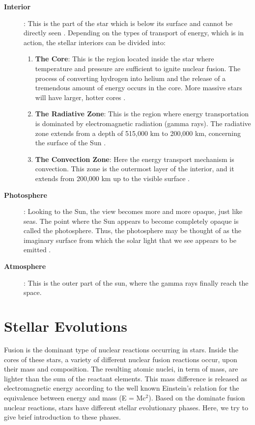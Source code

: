 \begin{description}
\item[\textbf{Interior}]: This is the part of the star which is below its surface and cannot be directly seen \citep{2019RSPTA.37790152A}. Depending on the types of transport of energy, which is in action, the stellar interiors can be divided into:
\begin{enumerate}
\item \textbf{The Core}: This is the region located inside the star where temperature and pressure are sufficient to ignite nuclear fusion. The process of converting hydrogen into helium and the release of a tremendous amount of energy occurs in the core. More massive stars will have larger, hotter cores \citep[e.g.,][]{1970AcA....20..195P,2019JPhG...46f5201V}.
\item\textbf{The Radiative Zone}: This is the region where energy transportation is dominated by electromagnetic radiation (gamma rays). The radiative zone extends from a depth of 515,000 km to 200,000 km, concerning the surface of the Sun \citep[e.g.,][]{2006ApJ...650.1208M}.
\item \textbf{ The Convection Zone}: Here the energy transport mechanism is convection. This zone is the outermost layer of the interior, and it extends from  200,000 km up to the visible surface \citep[e.g.,][]{2018csc..confE..46H, 2018PhPl...25i0702Y}.
\end{enumerate}

\item[\textbf{Photosphere}]: Looking to the Sun, the view becomes more and more opaque, just like seas. The point where the Sun appears to become completely opaque is called the photosphere. Thus, the photosphere may be thought of as the imaginary surface from which the solar light that we see appears to be emitted \citep[e.g.,][]{2018A&A...620A.183J,2019ApJ...874..103K}.

\item [\textbf{Atmosphere}]: This is the outer part of the sun, where the gamma rays finally reach the space.
\end{description}



\section{Stellar Evolutions}\label{evolution}
Fusion is the dominant type of nuclear reactions occurring in stars. Inside the cores of these stars, a variety of different nuclear fusion reactions occur, upon their mass and composition. The resulting atomic nuclei, in term of mass, are lighter than the sum of the reactant elements. This mass difference is released as electromagnetic energy according to the well known Einstein's relation for the equivalence between energy and mass (E = Mc$^{2}$). Based on the dominate fusion nuclear reactions, stars have different stellar evolutionary phases. Here, we try to give brief introduction to these phases.



